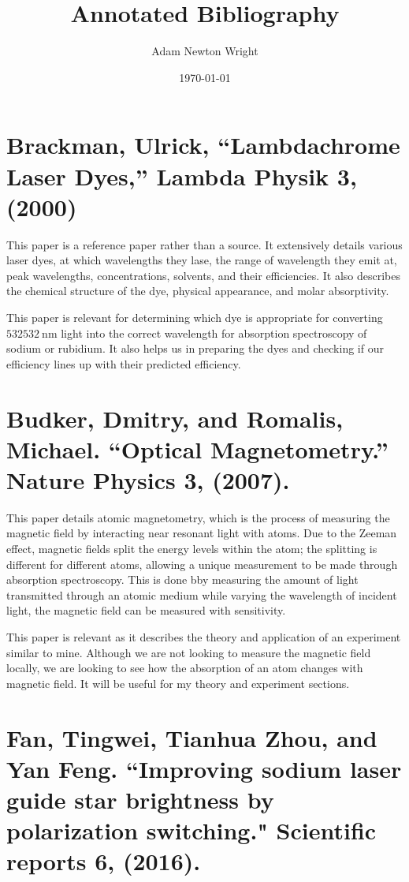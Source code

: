 \documentclass{article}
\title{Annotated Bibliography}
\author{Adam Newton Wright}
\date{\today}
\begin{document}
\maketitle

\section*{Brackman, Ulrick, ``Lambdachrome Laser Dyes,” Lambda Physik 3, (2000)}
This paper is a reference paper rather than a source. It extensively details various laser dyes, at which wavelengths they lase, the range of wavelength they emit at, peak wavelengths, concentrations, solvents, and their efficiencies. It also describes the chemical structure of the dye, physical appearance, and molar absorptivity.

This paper is relevant for determining which dye is appropriate for converting $532 \SI{532}{\nano \meter}$ light into the correct wavelength for absorption spectroscopy of sodium or rubidium. It also helps us in preparing the dyes and checking if our efficiency lines up with their predicted efficiency.

\section*{Budker, Dmitry, and Romalis, Michael. ``Optical Magnetometry.” Nature Physics 3, (2007).}
This paper details atomic magnetometry, which is the process of measuring the magnetic field by interacting near resonant light with atoms. Due to the Zeeman effect,  magnetic fields split the energy levels within the atom; the splitting is different for different atoms, allowing a unique measurement to be made through absorption spectroscopy. This is done bby measuring the amount of light transmitted through an atomic medium while varying the wavelength of incident light, the magnetic field can be measured with sensitivity. 

This paper is relevant as it describes the theory and application of an experiment similar to mine. Although we are not looking to measure the magnetic field locally, we are looking to see how the absorption of an atom changes with magnetic field. It will be useful for my theory and experiment sections.
%


\section*{Fan, Tingwei, Tianhua Zhou, and Yan Feng. ``Improving sodium laser guide star brightness by polarization switching." Scientific reports 6, (2016).}
\end{document}
